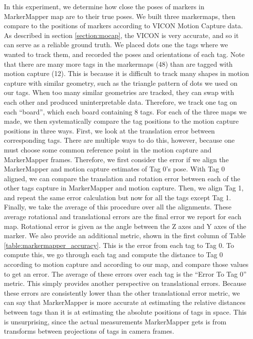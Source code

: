\documentclass{article}
\begin{document}
    In this experiment, we determine how close the poses of markers in MarkerMapper map are to their true poses. We built three markermaps, then compare to the positions of markers according to VICON Motion Capture data. As described in section \ref{section:mocap}, the VICON is very accurate, and so it can serve as a reliable ground truth. We placed dots one the tags where we wanted to track them, and recorded the poses and orientations of each tag. Note that there are many more tags in the markermaps (48) than are tagged with motion capture (12). This is because it is difficult to track many shapes in motion capture with similar geometry, such as the triangle pattern of dots we used on our tags. When too many similar geometries are tracked, they can swap with each other and produced uninterpretable data. Therefore, we track one tag on each ``board'', which each board containing 8 tags. For each of the three maps we made, we then systematically compare the tag positions to the motion capture positions in three ways. First, we look at the translation error between corresponding tags. There are multiple ways to do this, however, because one must choose some common reference point in the motion capture and MarkerMapper frames. Therefore, we first consider the error if we align the MarkerMapper and motion capture estimates of Tag 0's pose. With Tag 0 aligned, we can compare the translation and rotation error between each of the other tags capture in MarkerMapper and motion capture. Then, we align Tag 1, and repeat the same error calculation but now for all the tags except Tag 1. Finally, we take the average of this procedure over all the alignments. These average rotational and translational errors are the final error we report for each map. Rotational error is given as the angle between the Z axes and Y axes of the marker. We also provide an additional metric, shown in the first column of Table \ref{table:markermapper_accuracy}. This is the error from each tag to Tag 0. To compute this, we go through each tag and compute the distance to Tag 0 according to motion capture and according to our map, and compare those values to get an error. The average of these errors over each tag is the ``Error To Tag 0'' metric. This simply provides another perspective on translational errors. Because these errors are consistently lower than the other translational error metric, we can say that MarkerMapper is more accurate at estimating the relative distances between tags than it is at estimating the absolute positions of tags in space. This is unsurprising, since the actual measurements MarkerMapper gets is from transforms between projections of tags in camera frames.
\end{document}
